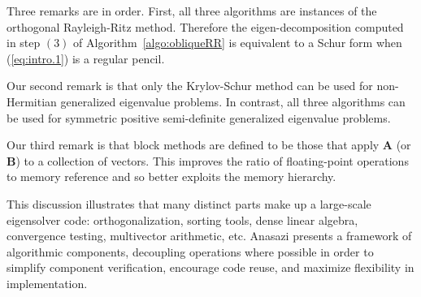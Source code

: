 \documentclass[acmtoms]{acmtrans2m}
\newcounter{algorithm}
\begin{document}
Three remarks are in order. First, all three algorithms are
instances of the orthogonal Rayleigh-Ritz method. Therefore the
eigen-decomposition computed in step $(3)$ of
Algorithm~\ref{algo:obliqueRR} is equivalent to a Schur form when
(\ref{eq:intro.1}) is a regular pencil.

Our second remark is that only the Krylov-Schur method can be used
for non-Hermitian generalized eigenvalue problems. In contrast, all
three algorithms can be used for symmetric positive semi-definite
generalized eigenvalue problems.

Our third remark is that block methods are defined to be those that
apply $\mathbf{A}$ (or $\mathbf{B}$) to a collection of vectors.
This improves the ratio of floating-point operations to memory
reference and so better exploits the memory hierarchy.

This discussion illustrates that many distinct parts make up a
large-scale eigensolver code: orthogonalization, sorting tools, dense
linear algebra, convergence testing, multivector arithmetic, etc.
Anasazi presents a framework of algorithmic components, decoupling
operations where possible in order to simplify component verification,
encourage code reuse, and maximize flexibility in implementation.

\end{document}
